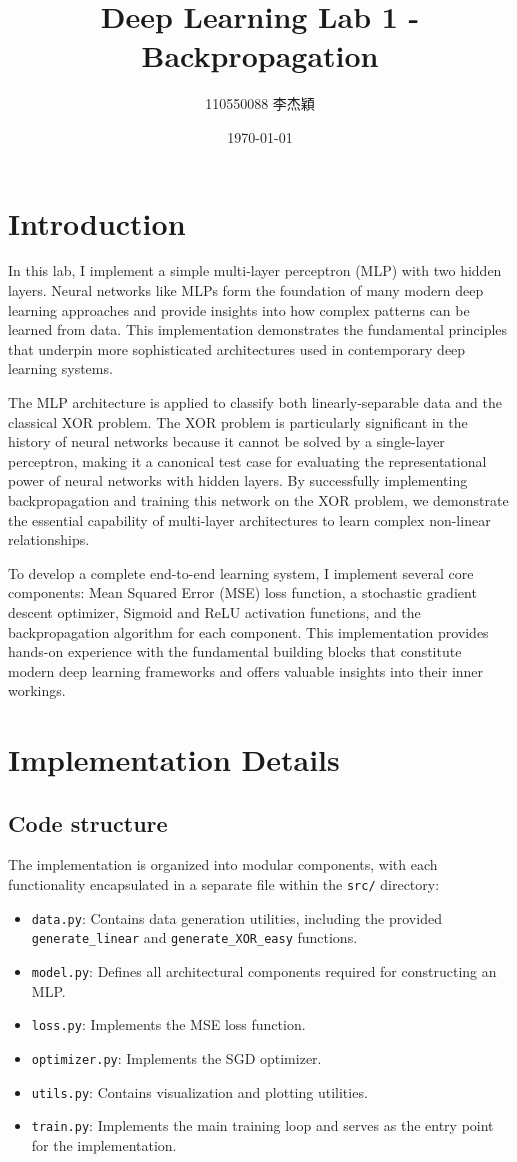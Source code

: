 \documentclass[twocolumn]{extarticle}
\title{Deep Learning Lab 1 - Backpropagation}
\author{110550088 李杰穎}
\date{\today}
\begin{document}
\maketitle

\section{Introduction}
In this lab, I implement a simple multi-layer perceptron (MLP) with two hidden layers. Neural networks like MLPs form the foundation of many modern deep learning approaches and provide insights into how complex patterns can be learned from data. This implementation demonstrates the fundamental principles that underpin more sophisticated architectures used in contemporary deep learning systems.

The MLP architecture is applied to classify both linearly-separable data and the classical XOR problem. The XOR problem is particularly significant in the history of neural networks because it cannot be solved by a single-layer perceptron, making it a canonical test case for evaluating the representational power of neural networks with hidden layers. By successfully implementing backpropagation and training this network on the XOR problem, we demonstrate the essential capability of multi-layer architectures to learn complex non-linear relationships.

To develop a complete end-to-end learning system, I implement several core components: Mean Squared Error (MSE) loss function, a stochastic gradient descent optimizer, Sigmoid and ReLU activation functions, and the backpropagation algorithm for each component. This implementation provides hands-on experience with the fundamental building blocks that constitute modern deep learning frameworks and offers valuable insights into their inner workings.

\section{Implementation Details}
\subsection{Code structure}
The implementation is organized into modular components, with each functionality encapsulated in a separate file within the \texttt{src/} directory:
\begin{itemize}
\item \texttt{data.py}: Contains data generation utilities, including the provided \texttt{generate\_linear} and \texttt{generate\_XOR\_easy} functions.
\item \texttt{model.py}: Defines all architectural components required for constructing an MLP.
\item \texttt{loss.py}: Implements the MSE loss function.
\item \texttt{optimizer.py}: Implements the SGD optimizer.
\item \texttt{utils.py}: Contains visualization and plotting utilities.
\item \texttt{train.py}: Implements the main training loop and serves as the entry point for the implementation.
\end{itemize}
\end{document}
